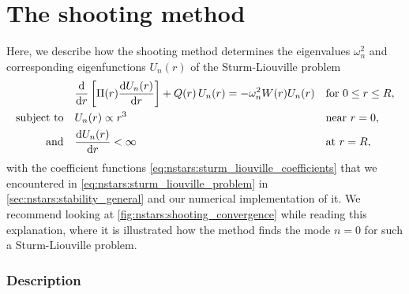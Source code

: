 
\section{The shooting method}
\label{sec:numerics:shooting_method}

Here, we describe how the shooting method determines the eigenvalues $\omega_n^2$ and corresponding eigenfunctions $U_n(r)$ of the Sturm-Liouville problem
\begin{subequations}
\begin{align}
	&\odv*{ \left[ \Pi(r) \odv{U_n(r)}{r} \right] }{r} + Q(r) \, U_n(r) = -\omega_n^2 W(r) U_n(r) && \text{for } 0 \leq r \leq R , \label{eq:shooting:sturm_liouville_diffeq} \\
	\text{subject to} \quad & U_n(r)          \propto r^3    && \text{near } r=0 , \label{eq:shooting:sturm_liouville_bc1} \\
	\text{and}        \quad & \odv{U_n(r)}{r} <       \infty && \text{at } r=R , \label{eq:shooting:sturm_liouville_bc2}
\end{align}%
\label{eq:shooting:sturm_liouville_problem}%
\end{subequations}%
with the coefficient functions \eqref{eq:nstars:sturm_liouville_coefficients} that we encountered in \cref{eq:nstars:sturm_liouville_problem} in \cref{sec:nstars:stability_general} and our numerical implementation of it.
We recommend looking at \cref{fig:nstars:shooting_convergence} while reading this explanation, where it is illustrated how the method finds the mode $n=0$ for such a Sturm-Liouville problem.

\subsubsection{Description}
\label{sec:numerics:shooting_method_description}

